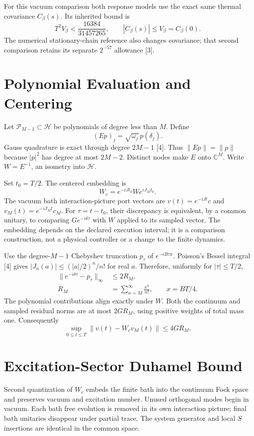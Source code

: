 \documentclass[a4paper,journal]{IEEEtran}
\begin{document}
For this vacuum comparison both response models use the exact same thermal covariance $C_\beta(s)$. Its inherited bound is
\begin{equation}\label{V}
 T^2 V_\beta<\frac{16384}{31457265},\qquad
 |C_\beta(s)|\le V_\beta=C_\beta(0).
\end{equation}
The numerical stationary-chain reference also changes covariance; that second comparison retains its separate $2^{-57}$ allowance [3].
\section{Polynomial Evaluation and Centering}
Let $\mathcal P_{M-1}\subset\mathcal H$ be polynomials of degree less than $M$. Define
\begin{equation}
 (Ep)_j=\sqrt{\omega_j}\,p(\delta_j).
\end{equation}
Gauss quadrature is exact through degree $2M-1$ [4]. Thus $\|Ep\|=\|p\|$ because $|p|^2$ has degree at most $2M-2$. Distinct nodes make $E$ onto $\mathbb C^M$. Write $W=E^{-1}$, an isometry into $\mathcal H$.

Set $t_0=T/2$. The centered embedding is
\begin{equation}
 W_c=e^{-iJt_0}W e^{iJ_Mt_0}.
\end{equation}
The vacuum bath interaction-picture port vectors are $v(t)=e^{-iJt}c$ and $v_M(t)=e^{-iJ_Mt}c_M$. For $\tau=t-t_0$, their discrepancy is equivalent, by a common unitary, to comparing $G e^{-i\delta\tau}$ with $W$ applied to its sampled vector. The embedding depends on the declared execution interval; it is a comparison construction, not a physical controller or a change to the finite dynamics.

Use the degree-$M-1$ Chebyshev truncation $p_\tau$ of $e^{-iB\tau x}$. Poisson's Bessel integral [4] gives $|J_n(a)|\le(|a|/2)^n/n!$ for real $a$. Therefore, uniformly for $|\tau|\le T/2$,
\begin{align}
 \|e^{-i\delta\tau}-p_\tau\|_\infty&\le2R_M,\\
 R_M&=\sum_{n=M}^{\infty}\frac{x^n}{n!},\qquad x=BT/4.
\end{align}
The polynomial contributions align exactly under $W$. Both the continuum and sampled residual norms are at most $2G R_M$, using positive weights of total mass one. Consequently
\begin{equation}\label{feature}
 \sup_{0\le t\le T}\|v(t)-W_cv_M(t)\|\le4G R_M.
\end{equation}
\section{Excitation-Sector Duhamel Bound}
Second quantization of $W_c$ embeds the finite bath into the continuum Fock space and preserves vacuum and excitation number. Unused orthogonal modes begin in vacuum. Each bath free evolution is removed in its own interaction picture; final bath unitaries disappear under partial trace. The system generator and local $S$ insertions are identical in the common space.
\end{document}
